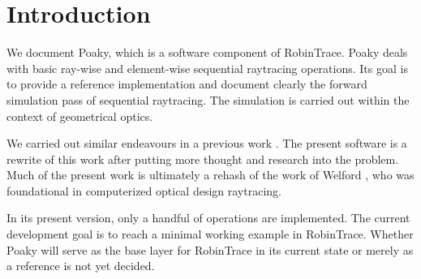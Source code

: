 \section{Introduction}
We document Poaky, which is a software component of RobinTrace. Poaky deals
with basic ray-wise and element-wise sequential raytracing operations. Its
goal is to provide a reference implementation and document clearly the
forward simulation pass of sequential raytracing. The simulation is carried
out within the context of geometrical optics.

We carried out similar endeavours in a previous work \cite{Houllier-thesis}.
The present software is a rewrite of this work after putting more thought and
research into the problem. Much of the present work is ultimately a rehash of
the work of Welford \cite{Welford:1986}, who was foundational in computerized
optical design raytracing.

In its present version, only a handful of operations are implemented. The
current development goal is to reach a minimal working example in RobinTrace.
Whether Poaky will serve as the base layer for RobinTrace in its current state
or merely as a reference is not yet decided.
